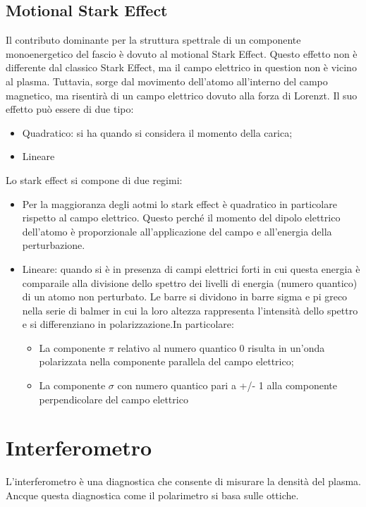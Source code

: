 \documentclass{article}
\begin{document}
\subsection{Motional Stark Effect}
Il contributo dominante per la struttura spettrale di un componente monoenergetico del fascio è dovuto al motional Stark Effect. Questo effetto non è differente dal classico Stark Effect, ma il campo elettrico in question non è vicino al plasma. Tuttavia, sorge dal movimento dell'atomo all'interno del campo magnetico, ma risentirà di un campo elettrico dovuto alla forza di Lorenzt.\newline
Il suo effetto può essere di due tipo:\begin{itemize}
    \item Quadratico: si ha quando si considera il momento della carica;
    \item Lineare
\end{itemize}
Lo stark effect si compone di due regimi:\begin{itemize}
    \item Per la maggioranza degli aotmi lo stark effect è quadratico in particolare rispetto al campo elettrico. Questo perché il momento del dipolo elettrico dell'atomo è proporzionale all'applicazione del campo e all'energia della perturbazione.
    \item Lineare: quando si è in presenza di campi elettrici forti in cui questa energia è comparaile alla divisione dello spettro dei livelli di energia (numero quantico) di un atomo non perturbato. Le barre si dividono in barre sigma e pi greco nella serie di balmer in cui la loro altezza rappresenta l'intensità dello spettro e si differenziano in polarizzazione.In particolare:\begin{itemize}
        \item La componente \(\pi \) relativo al numero quantico 0 risulta in un'onda polarizzata nella componente parallela del campo elettrico;
        \item La componente \(\sigma \) con numero quantico pari a +/- 1 alla componente perpendicolare del campo elettrico
    \end{itemize}
\end{itemize}
\section{Interferometro}
L'interferometro è una diagnostica che consente di misurare la densità del plasma. Ancque questa diagnostica come il polarimetro si basa sulle ottiche.\newpage
\end{document}
